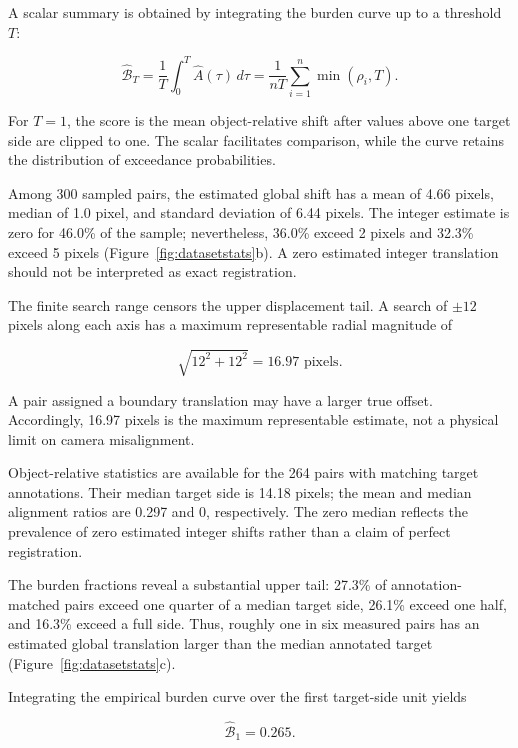\documentclass[10pt]{article}
\newcommand{\burden}{\widehat A}
\begin{document}
A scalar summary is obtained by integrating the burden curve up to a threshold $T$:

\begin{equation}
\widehat{\mathcal B}_T=\frac{1}{T}\int_0^T\burden(\tau)\,d\tau
=\frac{1}{nT}\sum_{i=1}^n\min(\rho_i,T).
\label{eq:burdenscore}
\end{equation}

For $T=1$, the score is the mean object-relative shift after values above one target side are clipped to one. The scalar facilitates comparison, while the curve retains the distribution of exceedance probabilities.

Among 300 sampled pairs, the estimated global shift has a mean of 4.66 pixels, median of 1.0 pixel, and standard deviation of 6.44 pixels. The integer estimate is zero for 46.0\% of the sample; nevertheless, 36.0\% exceed 2 pixels and 32.3\% exceed 5 pixels (Figure~\ref{fig:datasetstats}b). A zero estimated integer translation should not be interpreted as exact registration.

The finite search range censors the upper displacement tail. A search of $\pm12$ pixels along each axis has a maximum representable radial magnitude of

\begin{equation}
\sqrt{12^2+12^2}=16.97 \text{ pixels}.
\end{equation}

A pair assigned a boundary translation may have a larger true offset. Accordingly, 16.97 pixels is the maximum representable estimate, not a physical limit on camera misalignment.

Object-relative statistics are available for the 264 pairs with matching target annotations. Their median target side is 14.18 pixels; the mean and median alignment ratios are 0.297 and 0, respectively. The zero median reflects the prevalence of zero estimated integer shifts rather than a claim of perfect registration.

The burden fractions reveal a substantial upper tail: 27.3\% of annotation-matched pairs exceed one quarter of a median target side, 26.1\% exceed one half, and 16.3\% exceed a full side. Thus, roughly one in six measured pairs has an estimated global translation larger than the median annotated target (Figure~\ref{fig:datasetstats}c).

Integrating the empirical burden curve over the first target-side unit yields

\begin{equation}
\widehat{\mathcal B}_1=0.265.
\end{equation}
\end{document}
